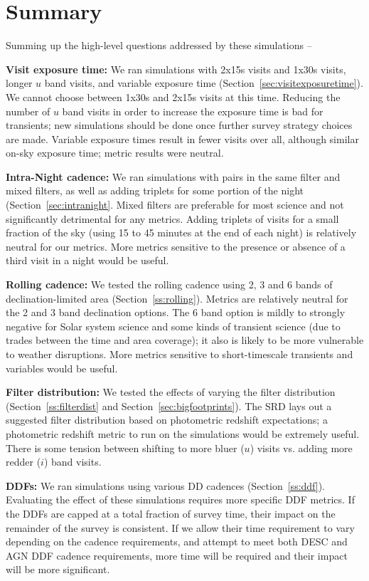 \section{Summary}

Summing up the high-level questions addressed by these simulations --

{\bf Visit exposure time:}  We ran simulations with 2x15s visits and 1x30s visits, longer $u$ band visits, and variable exposure time (Section~\ref{sec:visitexposuretime}). We cannot choose between 1x30s and 2x15s visits at this time. Reducing the number of $u$ band visits in order to increase the exposure time is bad for transients; new simulations should be done once further survey strategy choices are made. Variable exposure times result in fewer visits over all, although similar on-sky exposure time; metric results were neutral. 

{\bf Intra-Night cadence:} We ran simulations with pairs in the same filter and mixed filters, as well as adding triplets for some portion of the night (Section~\ref{sec:intranight}. Mixed filters are preferable for most science and not significantly detrimental for any metrics. Adding triplets of visits for a small fraction of the sky (using 15 to 45 minutes at the end of each night) is relatively neutral for our metrics. More metrics sensitive to the presence or absence of a third visit in a night would be useful.

{\bf Rolling cadence:} We tested the rolling cadence using 2, 3 and 6 bands of declination-limited area (Section~\ref{ss:rolling}). Metrics are relatively neutral for the 2 and 3 band declination options. The 6 band option is mildly to strongly negative for Solar system science and some kinds of transient science (due to trades between the time and area coverage); it also is likely to be more vulnerable to weather disruptions. More metrics sensitive to short-timescale transients and variables would be useful. 

{\bf Filter distribution:} We tested the effects of varying the filter distribution (Section~\ref{ss:filterdist} and Section~\ref{sec:bigfootprints}). The SRD lays out a suggested filter distribution based on photometric redshift expectations; a photometric redshift metric to run on the simulations would be extremely useful. There is some tension between shifting to more bluer ($u$) visits vs. adding more redder ($i$) band visits. 

{\bf DDFs:} We ran simulations using various DD cadences (Section~\ref{ss:ddf}). Evaluating the effect of these simulations requires more specific DDF metrics. If the DDFs are capped at a total fraction of survey time, their impact on the remainder of the survey is consistent. If we allow their time requirement to vary depending on the cadence requirements, and attempt to meet both DESC and AGN DDF cadence requirements, more time will be required and their impact will be more significant.


